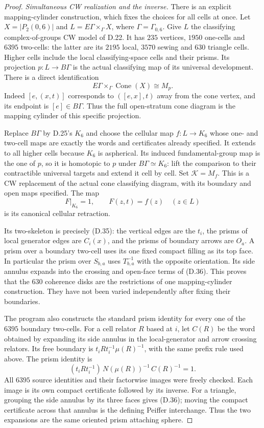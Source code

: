 \begin{proof}
\emph{Simultaneous CW realization and the inverse.}
There is an explicit mapping-cylinder construction,
which fixes the choices for all cells at once.
Let $X=|P_2(0,6)|$ and
$L=E\Gamma\times_\Gamma X$, where
$\Gamma=\Gamma_{0,6}$.  Give $L$ the classifying
complex-of-groups CW model of D.22.  It has $235$
vertices, $1950$ one-cells and $6395$ two-cells:
the latter are its $2195$ local, $3570$ sewing and
$630$ triangle cells.  Higher cells include the
local classifying-space cells and their prisms.
Its projection $p:L\to B\Gamma$ is the actual
classifying map of its universal development.
There is a direct identification
\[
 E\Gamma\times_\Gamma\operatorname{Cone}(X)
                   \cong M_p.
\]
Indeed $[e,(x,t)]$ corresponds to $([e,x],t)$
away from the cone vertex, and its endpoint is
$[e]\in B\Gamma$.  Thus the full open-stratum
cone diagram is the mapping cylinder of this
specific projection.

Replace $B\Gamma$ by D.25's $K_6$ and choose the
cellular map $f:L\to K_6$ whose one- and two-cell
maps are exactly the words and certificates already
specified.  It extends to all higher cells because
$K_6$ is aspherical.  Its induced fundamental-group
map is the one of $p$, so it is homotopic to $p$
under $B\Gamma\simeq K_6$: lift the comparison to
their contractible universal targets and extend it
cell by cell.  Set $\mathcal K=M_f$.
This is a CW replacement of the actual cone
classifying diagram, with its boundary and open
maps specified.  The map
\[
 F|_{K_6}=1,\qquad F(z,t)=f(z)\quad(z\in L)
                                                               \tag{D.38}
\]
is its canonical cellular retraction.

Its two-skeleton is precisely (D.35): the vertical
edges are the $t_i$, the prisms of local generator
edges are $C_i(x)$, and the prisms of boundary
arrows are $O_a$.  A prism over a boundary two-cell
uses its one fixed compact filling as its top
face.  In particular the prism over $S_{b,a}$
uses $T_{b,a}^{-1}$ with the opposite orientation.
Its side annulus expands into the crossing and
open-face terms of (D.36).  This proves that the
$630$ coherence disks are the restrictions of
one mapping-cylinder construction.  They have
not been varied independently after fixing their
boundaries.

The program also constructs the standard prism
identity for every one of the $6395$ boundary
two-cells.  For a cell relator $R$ based at $i$,
let $C(R)$ be the word obtained by expanding its
side annulus in the local-generator and arrow
crossing relators.  Its free boundary is
$t_iRt_i^{-1}\mu(R)^{-1}$, with the same
prefix rule used above.  The prism identity is
\[
          (t_iRt_i^{-1})\,N(\mu(R))^{-1}\,C(R)^{-1}=1.
                                                               \tag{D.39}
\]
All $6395$ source identities and their factorwise
images were freely checked.  Each image is its
own compact certificate followed by its inverse.
For a triangle, grouping the side annulus by its
three faces gives (D.36); moving the compact
certificate across that annulus is the defining
Peiffer interchange.  Thus the two expansions
are the same oriented prism attaching sphere.


\end{proof}
